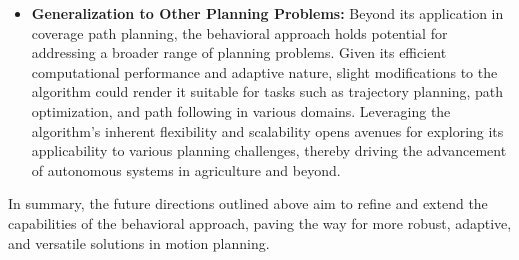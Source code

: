 \begin{itemize}
    \item \textbf{Generalization to Other Planning Problems:} Beyond its application in coverage path planning, the behavioral approach holds potential for addressing a broader range of planning problems. Given its efficient computational performance and adaptive nature, slight modifications to the algorithm could render it suitable for tasks such as trajectory planning, path optimization, and path following in various domains. Leveraging the algorithm's inherent flexibility and scalability opens avenues for exploring its applicability to various planning challenges, thereby driving the advancement of autonomous systems in agriculture and beyond.
\end{itemize}


In summary, the future directions outlined above aim to refine and extend the capabilities of the behavioral approach, paving the way for more robust, adaptive, and versatile solutions in motion planning.